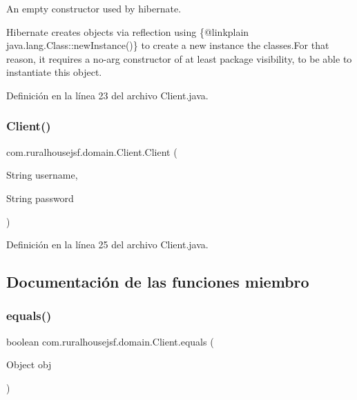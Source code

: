An empty constructor used by hibernate. 

Hibernate creates objects via reflection using \{@linkplain java.\+lang.\+Class\+::new\+Instance()\} to create a new instance the classes.\+For that reason, it requires a no-\/arg constructor of at least package visibility, to be able to instantiate this object. 

Definición en la línea 23 del archivo Client.\+java.

\mbox{\label{classcom_1_1ruralhousejsf_1_1domain_1_1_client_a57bf8892cfbb684bcda11d6bb786871b}} 
\subsubsection{\texorpdfstring{Client()}{Client()}\hspace{0.1cm}{\footnotesize\ttfamily [2/2]}}
{\footnotesize\ttfamily com.\+ruralhousejsf.\+domain.\+Client.\+Client (\begin{DoxyParamCaption}\item[{String}]{username,  }\item[{String}]{password }\end{DoxyParamCaption})}



Definición en la línea 25 del archivo Client.\+java.



\subsection{Documentación de las funciones miembro}
\mbox{\label{classcom_1_1ruralhousejsf_1_1domain_1_1_client_acf199d84c39f08cea14078ef175be9f5}} 
\subsubsection{\texorpdfstring{equals()}{equals()}}
{\footnotesize\ttfamily boolean com.\+ruralhousejsf.\+domain.\+Client.\+equals (\begin{DoxyParamCaption}\item[{Object}]{obj }\end{DoxyParamCaption})}



